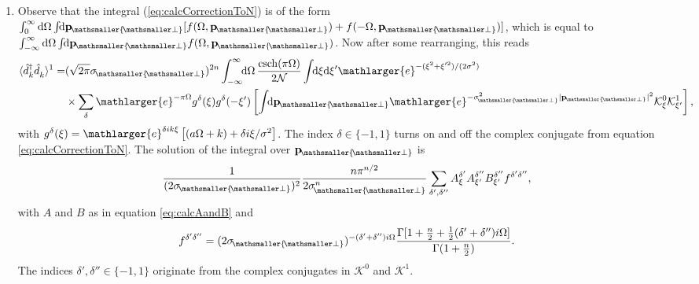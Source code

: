 \documentclass[11pt, a4paper]{article}
\def\bp{{\bf p}}
\newcommand{\Om}{\Omega}
\newcommand{\si}{{\sigma}}
\newcommand{\mc}[1]{\mathcal{#1}}
\newcommand{\sfrac}[2]{{\textstyle\frac{#1}{#2}}}
\newcommand{\half}{\sfrac{1}{2}}
\newcommand{\nn}{\nonumber}
\newcommand{\integral}{\int\!\! \mathrm{d}}
\newcommand{\csch}{\mathrm{csch}}
\let\perptmp\perp
\renewcommand{\perp}{{\! \mathsmaller{\perptmp}}}
\newcommand{\e}{\mathlarger{e}}
\newcommand{\nodagger}{{\phantom{\dagger}}}
\newcommand{\ddd}{\langle \hat d_k^\dagger \hat d^\nodagger_k \rangle}
\begin{document}
\begin{enumerate}
\item Observe that the integral (\ref{eq:calcCorrectionToN}) is of the form $\int_0^\infty \mathrm{d}\Om\integral \bp_\perp[f(\Om,\bp_\perp)+f(-\Om,\bp_\perp)]$, which is equal to $\int_{-\infty}^\infty \mathrm{d}\Om\integral \bp_\perp f(\Om,\bp_\perp)$. Now after some rearranging, this reads
\begin{align*}
\ddd^1=&(\sqrt{2\pi}\si_\perp)^{2n}\int_{-\infty}^\infty \!\!\mathrm{d}\Om\, \frac{ \csch(\pi\Om)}{2 \mc N} \integral \xi \mathrm d \xi'\e^{-(\xi^2+\xi'^2)/(2\si ^2)}\\
&\times \sum_{\delta}\e^{-\pi\Om}g^\delta(\xi)g^\delta(-\xi')
\left[\integral \bp_\perp \e^{-\si_\perp^2|\bp_\perp|^2}\mathcal K^0_\xi\mathcal K^1_{\xi'}\right],\nn
\end{align*}
with $g^\delta(\xi) =\e^{\delta i k \xi}\left[( a\Om+k)+\delta i \xi/\si ^2\right]$. The index $\delta\in\{-1,1\}$ turns on and off the complex conjugate from equation \ref{eq:calcCorrectionToN}. The solution of the integral over $\bp_\perp$ is 
\begin{align*}
\frac{1}{(2 \si_\perp)^2}\frac{n\pi^{n/2}}{2\si_\perp^n}\sum_{\delta',\delta''}A^{\delta'}_{\xi}A^{\delta''}_{\xi'}B^{\delta''}_{\xi'} f^{\delta'\delta''},
\end{align*}
with $A$ and $B$ as in equation \ref{eq:calcAandB} and
\begin{align*}
f^{\delta'\delta''}=(2\si_\perp)^{-(\delta'+\delta'')i\Om}\frac{\Gamma[1+\frac{n}{2}+\half(\delta'+\delta'')i\Om]}{\Gamma(1+\frac{n}{2})}.
\end{align*}
The indices $\delta',\delta''\in\{-1,1\}$ originate from the complex conjugates in $\mc K^0$ and $\mc K^1$. 



\end{enumerate}
\end{document}
